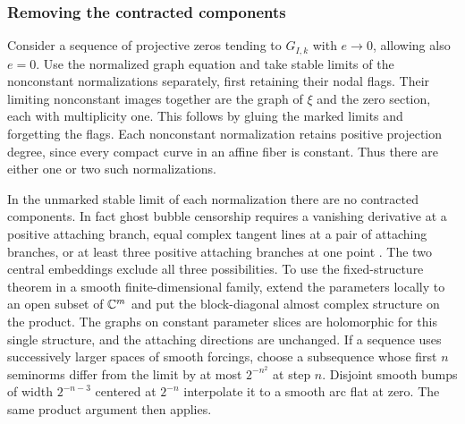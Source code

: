 \subsubsection{Removing the contracted components}
Consider a sequence of projective zeros tending to $G_{I,k}$ with
$e\to0$, allowing also $e=0$. Use the normalized graph equation and
take stable limits of the nonconstant normalizations separately,
first retaining their nodal flags. Their limiting nonconstant images
together are the graph of $\xi$ and the zero section, each with
multiplicity one. This follows by gluing the marked limits and
forgetting the flags. Each nonconstant normalization retains positive
projection degree, since every compact curve in an affine fiber is
constant. Thus there are either one or two such normalizations.

In the unmarked stable limit of each normalization there are no
contracted components. In fact ghost bubble censorship requires a
vanishing derivative at a positive attaching branch, equal complex
tangent lines at a pair of attaching branches, or at least three
positive attaching branches at one point
\cite[Theorem~1.1]{ekholm}. The two central embeddings exclude
all three possibilities. To use the fixed-structure theorem in a
smooth finite-dimensional family, extend the parameters locally to
an open subset of $\mathbb C^m$ and put the block-diagonal almost complex
structure on the product. The graphs on constant parameter slices
are holomorphic for this single structure, and the attaching
directions are unchanged. If a sequence uses successively larger
spaces of smooth forcings, choose a subsequence whose first $n$
seminorms differ from the limit by at most $2^{-n^2}$ at step $n$.
Disjoint smooth bumps of width $2^{-n-3}$ centered at $2^{-n}$
interpolate it to a smooth arc flat at zero. The same product argument
then applies.

